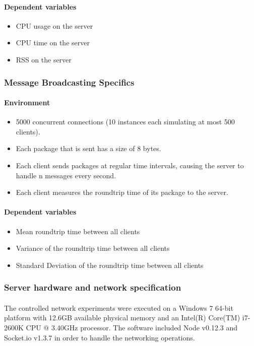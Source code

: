 \documentclass[bsc,frontabs,twoside,singlespacing,parskip,deptreport]{infthesis}     %
\begin{document}
\paragraph{Dependent variables}
\begin{itemize}
\item CPU usage on the server
\item CPU time on the server
\item RSS on the server
\end{itemize}

\subsubsection{Message Broadcasting Specifics}
\paragraph{Environment}
\begin{itemize}
\item 5000 concurrent connections (10 instances each simulating at most 500 clients).
\item Each package that is sent has a size of 8 bytes.
\item Each client sends packages at regular time intervals, causing the server to handle n messages every second.
\item Each client measures the roundtrip time of its package to the server.
\end{itemize}

\paragraph{Dependent variables}
\begin{itemize}
\item Mean roundtrip time between all clients
\item Variance of the roundtrip time between all clients
\item Standard Deviation of the roundtrip time between all clients
\end{itemize}

\subsubsection{Server hardware and network specification}
\paragraph{}The controlled network experiments were executed on a Windows 7 64-bit platform with 12.6GB available physical memory and an Intel(R) Core(TM) i7-2600K CPU @ 3.40GHz processor. The software included Node v0.12.3 and Socket.io v1.3.7 in order to handle the networking operations.
\end{document}
